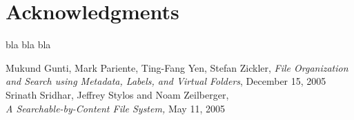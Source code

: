 \documentclass[10pt,twocolumn]{article}
\begin{document}
\section*{Acknowledgments}
bla bla bla
\begin{thebibliography}{9}
\small  %


Mukund Gunti, Mark Pariente, Ting-Fang Yen, Stefan Zickler,
{\em File Organization and Search using Metadata, Labels, and Virtual Folders},
December 15, 2005
Srinath Sridhar, Jeffrey Stylos and Noam Zeilberger,\\
{\em A Searchable-by-Content File System,} May 11, 2005

\end{thebibliography}
\end{document}
